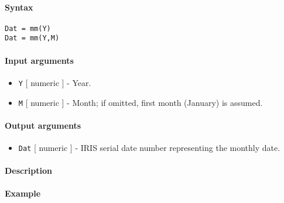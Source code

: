 


	\paragraph{Syntax}

\begin{verbatim}
Dat = mm(Y)
Dat = mm(Y,M)
\end{verbatim}

\paragraph{Input arguments}

\begin{itemize}
\item
  \texttt{Y} {[} numeric {]} - Year.
\item
  \texttt{M} {[} numeric {]} - Month; if omitted, first month (January)
  is assumed.
\end{itemize}

\paragraph{Output arguments}

\begin{itemize}
\itemsep1pt\parskip0pt
\item
  \texttt{Dat} {[} numeric {]} - IRIS serial date number representing
  the monthly date.
\end{itemize}

\paragraph{Description}

\paragraph{Example}


